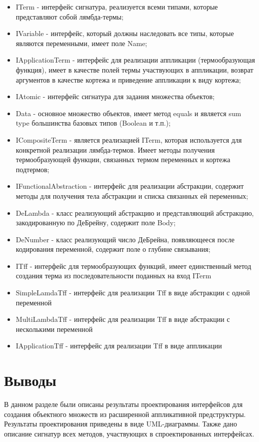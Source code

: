 \begin{itemize}
	\item ITerm - интерфейс сигнатура, реализуется всеми типами, которые представляют собой лямбда-термы;
	\item IVariable - интерфейс, который должны наследовать все типы, которые являются переменными, имеет поле Name;
	\item IApplicationTerm - интерфейс для реализации аппликации (термообразующая функция), имеет в качестве полей термы участвующих в аппликации, возврат аргументов в качестве кортежа и приведение аппликации к виду кортежа;
	\item IAtomic - интерфейс сигнатура для задания множества объектов;
	\item Data - основное множество объектов, имеет метод equals и является sum type большинства базовых типов (Boolean и т.п.);
	\item ICompositeTerm - является реализацией ITerm, которая используется для конкретной реализации лямбда-термов. Имеет методы получения термообразующей функции, связанных термом переменных и кортежа подтермов;
	\item IFunctionalAbstraction - интерфейс для реализации абстракции, содержит методы для получения тела абстракции и списка связанных ей переменных;
	\item DeLambda - класс реализующий абстракцию и представляющий абстракцию, закодированную по ДеБрейну, содержит поле Body;
	\item DeNumber - класс реализующий число ДеБрейна, появляющееся после кодирования переменной, содержит поле о глубине связывания;
	\item ITff - интерфейс для термообразующих функций, имеет единственный метод создания терма из последовательности поданных на вход ITerm
	\item SimpleLamdaTff - интерфейс для реализации Tff в виде абстракции с одной переменной
	\item MultiLambdaTff - интерфейс для реализации Tff в виде абстракции с несколькими переменной
	\item IApplicationTff - интерфейс для реализации Tff в виде аппликации
\end{itemize}

\section{Выводы}

\begin{annotation}
	В данном разделе были описаны результаты проектирования интерфейсов для создания объектного множеств из расширенной аппликативной предструктуры. Результаты проектирования приведены в виде UML-диаграммы. Также дано описание сигнатур всех методов, участвующих в спроектированных интерфейсах.
\end{annotation}

